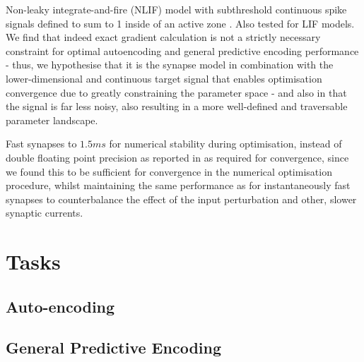 \documentclass[mphil,deptreport,ianc]{infthesis} %
\begin{document}
Non-leaky integrate-and-fire (NLIF) model with subthreshold continuous spike signals defined to sum to 1 inside of an active zone \cite{Huh2017}.
Also tested for LIF models.
We find that indeed exact gradient calculation is not a strictly necessary constraint for optimal autoencoding and general predictive encoding performance - thus, we hypothesise that it is the synapse model in combination with the lower-dimensional and continuous target signal that enables optimisation convergence due to greatly constraining the parameter space - and also in that the signal is far less noisy, also resulting in a more well-defined and traversable parameter landscape.

Fast synapses to $1.5 \si{ms}$ for numerical stability during optimisation, instead of double floating point precision as reported in \cite{Huh2017} as required for convergence, since we found this to be sufficient for convergence in the numerical optimisation procedure, whilst maintaining the same performance as for instantaneously fast synapses to counterbalance the effect of the input perturbation and other, slower synaptic currents.


\section{Tasks}

\subsection{Auto-encoding}

\subsection{General Predictive Encoding}
\end{document}
